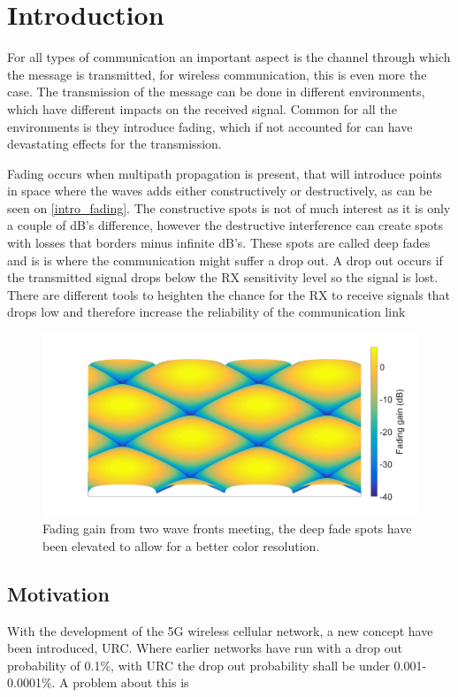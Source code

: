 \chapter{Introduction}

%

For all types of communication an important aspect is the channel through which the message is transmitted, for wireless communication, this is even more the case. The transmission of the message can be done in different environments, which have different impacts on the received signal. Common for all the environments is they introduce fading, which if not accounted for can have devastating effects for the transmission. 

Fading occurs when multipath propagation is present, that will introduce points in space where the waves adds either constructively or destructively, as can be seen on \autoref{intro_fading}. The constructive spots is not of much interest as it is only a couple of dB's difference, however the destructive interference can create spots with losses that borders minus infinite dB's. These spots are called deep fades and is is where the communication might suffer a drop out. A drop out occurs if the transmitted signal drops below the RX sensitivity level so the signal is lost. There are different tools to heighten the chance for the RX to receive signals that drops low and therefore increase the reliability of the communication link


\begin{figure}[H]
\centering
\includegraphics[width=\textwidth]{figures/intro_fading.png}
\caption{Fading gain from two wave fronts meeting, the deep fade spots have been elevated to allow for a better color resolution.}
\label{intro_fading}
\end{figure}

\section{Motivation}
With the development of the 5G wireless cellular network, a new concept have been introduced, \gls{URC}. Where earlier networks have run with a drop out probability of 0.1\%, with URC the drop out probability shall be under 0.001-0.0001\%. A problem about this is 


